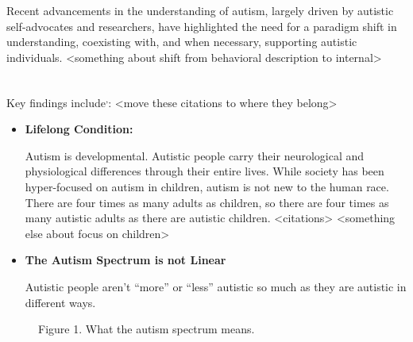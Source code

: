 \documentclass[
  letterpaper,
  DIV=11,
  numbers=noendperiod]{scrreprt}
\begin{document}
Recent advancements in the understanding of autism, largely driven by
autistic self-advocates and researchers, have highlighted the need for a
paradigm shift in understanding, coexisting with, and when necessary,
supporting autistic individuals. \textless something about shift from
behavioral description to internal\textgreater{}\\
\strut \\
Key findings
include\textsuperscript{,}:
\textless move these citations to where they belong\textgreater{}

\begin{itemize}
\item
  \textbf{Lifelong Condition:}

  Autism is developmental. Autistic people carry their neurological and
  physiological differences through their entire lives. While society
  has been hyper-focused on autism in children, autism is not new to the
  human race. There are four times as many adults as children, so there
  are four times as many autistic adults as there are autistic children.
  \textless citations\textgreater{} \textless something else about focus
  on children\textgreater{}
\item
  \textbf{The Autism Spectrum is not Linear}

  Autistic people aren't ``more'' or ``less'' autistic so much as they
  are autistic in different ways.
\end{itemize}

\begin{figure}


\caption{\label{fig-autism-spectrum}Figure 1. What the autism spectrum
means.}

\end{figure}%
\end{document}

